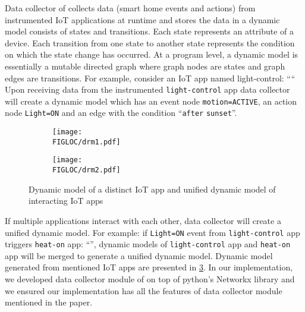 
Data collector of \iotguard collects data (smart home events and actions) from instrumented IoT applications at runtime and stores the data in a dynamic model consists of states and transitions.
Each state represents an attribute of a device. Each transition from one state to another state represents the condition on which the state change has occurred. 
At a program level, a dynamic model is essentially a mutable directed graph where graph nodes are states and graph edges are transitions.
For example, consider an IoT app named light-control: ````
Upon receiving data from the instrumented \verb*|light-control| app data collector will create a dynamic model which has an event node \verb*|motion=ACTIVE|, an action node \verb*|Light=ON| and an edge with the condition ``\verb*|after| \verb*|sunset|''.

\begin{figure}
	\centering
	\begin{subfigure}[c]{0.35\linewidth}
		\texttt{[image: \\FIGLOC/drm1.pdf]}
		\label{fig:light-app}
	\end{subfigure}
	\begin{subfigure}[c]{0.6\linewidth}
		\texttt{[image: \\FIGLOC/drm2.pdf]}
		\label{fig:combined-model}
	\end{subfigure}
	\vspace{-0.3in}
	\caption{ Dynamic model of a distinct IoT app and unified dynamic model of interacting IoT apps}
	\label{fig:dynamic-model}
\end{figure}
If multiple applications interact with each other, data collector will create a unified dynamic model.
For example: if \verb*|Light=ON| event from \verb*|light-control| app triggers \verb*|heat-on| app: ``'', dynamic models of \verb*|light-control| app and \verb*|heat-on| app will be merged to generate a unified dynamic model. Dynamic model generated from mentioned IoT apps are presented in \FIGREF \ref{fig:dynamic-model}. In our implementation, we developed data collector module of \iotguard on top of python's Networkx library and we ensured our implementation has all the features of data collector module mentioned in the \iotguard paper.

